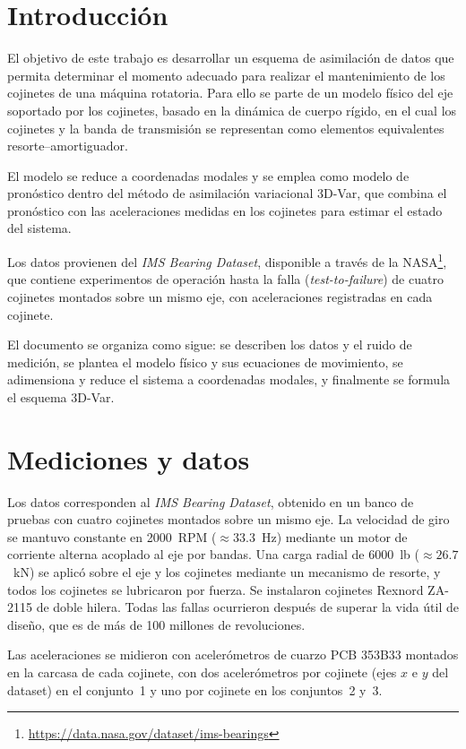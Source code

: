 \section{Introducción}

El objetivo de este trabajo es desarrollar un esquema de asimilación de datos que permita determinar el momento adecuado 
para realizar el mantenimiento de los cojinetes de una máquina rotatoria. Para ello se parte de un modelo físico del eje 
soportado por los cojinetes, basado en la dinámica de cuerpo rígido, en el cual los cojinetes y la banda de transmisión se 
representan como elementos equivalentes resorte--amortiguador.

El modelo se reduce a coordenadas modales y se emplea como modelo de pronóstico dentro del método de asimilación variacional 
3D-Var, que combina el pronóstico con las aceleraciones medidas en los cojinetes para estimar el estado del sistema.

Los datos provienen del \emph{IMS Bearing Dataset}, disponible a través de la 
NASA\footnote{\url{https://data.nasa.gov/dataset/ims-bearings}}, que contiene experimentos de operación hasta la falla 
(\emph{test-to-failure}) de cuatro cojinetes montados sobre un mismo eje, con aceleraciones registradas en cada cojinete.

El documento se organiza como sigue: se describen los datos y el ruido de medición, se plantea el modelo físico y sus 
ecuaciones de movimiento, se adimensiona y reduce el sistema a coordenadas modales, y finalmente se formula el esquema 3D-Var.

\section{Mediciones y datos}

Los datos corresponden al \emph{IMS Bearing Dataset}, obtenido en un banco de pruebas con cuatro cojinetes montados 
sobre un mismo eje. La velocidad de giro se mantuvo constante en 2000~RPM ($\approx 33.3$~Hz) mediante un motor de 
corriente alterna acoplado al eje por bandas. Una carga radial de 6000~lb ($\approx 26.7$~kN) se aplicó sobre el eje y 
los cojinetes mediante un mecanismo de resorte, y todos los cojinetes se lubricaron por fuerza. Se instalaron cojinetes 
Rexnord ZA-2115 de doble hilera. Todas las fallas ocurrieron después de superar la vida útil de diseño, que es de más de 
100 millones de revoluciones.

Las aceleraciones se midieron con acelerómetros de cuarzo PCB 353B33 montados en la carcasa de cada cojinete, con dos 
acelerómetros por cojinete (ejes $x$ e $y$ del dataset) en el conjunto~1 y uno por cojinete en los conjuntos~2 y~3.

